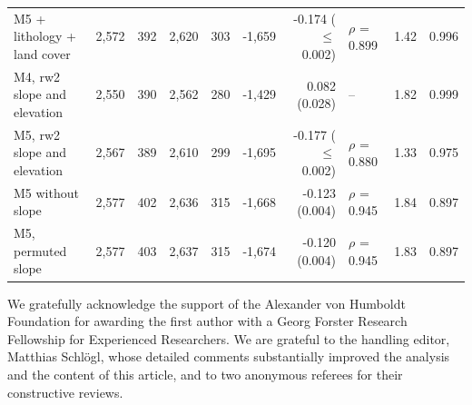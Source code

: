 \documentclass[journal abbreviation, manuscript]{copernicus}
\newcommand{\hlE}[1]{#1}
\begin{document}
\begin{table}[h]
\begin{tabular}{@{}lrrrrrrlrr@{}}
M5 + lithology + land cover & 2,572 & 392 & 2,620 & 303 & -1,659 & -0.174 ($\leq$0.002) & $\rho$ = 0.899 & 1.42 & 0.996 \\
M4, rw2 slope and elevation & 2,550 & 390 & 2,562 & 280 & -1,429 & 0.082 (0.028) & -- & 1.82 & 0.999 \\
M5, rw2 slope and elevation & 2,567 & 389 & 2,610 & 299 & -1,695 & -0.177 ($\leq$0.002) & $\rho$ = 0.880 & 1.33 & 0.975 \\
M5 without slope & 2,577 & 402 & 2,636 & 315 & -1,668 & -0.123 (0.004) & $\rho$ = 0.945 & 1.84 & 0.897 \\
M5, permuted slope & 2,577 & 403 & 2,637 & 315 & -1,674 & -0.120 (0.004) & $\rho$ = 0.945 & 1.83 & 0.897 \\
\bottomrule
\end{tabular}
\end{table}

\noappendix




\begin{acknowledgements}
We gratefully acknowledge the support of the Alexander von Humboldt Foundation for awarding the first author with a Georg Forster Research Fellowship for Experienced Researchers. \hlE{We are grateful to the handling editor, Matthias Schl\"{o}gl, whose detailed comments substantially improved the analysis and the content of this article, and to two anonymous referees for their constructive reviews.}
\end{acknowledgements}




\end{document}
